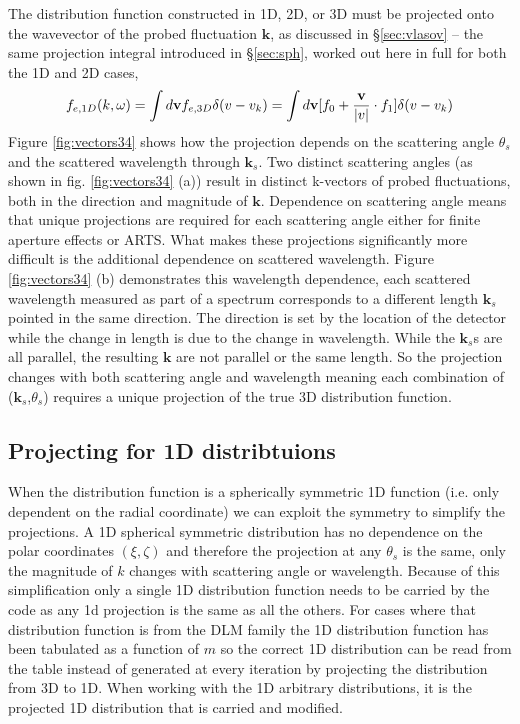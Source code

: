 \documentclass[11pt]{article}
\begin{document}
The distribution function constructed in 1D, 2D, or 3D must be projected onto the wavevector of the probed fluctuation $\textbf{k}$, as discussed in \S \ref{sec:vlasov} -- the same projection integral introduced in \S\ref{sec:sph}, worked out here in full for both the 1D and 2D cases,
\begin{equation}\label{fekw}
    f_{e,1D}(k,\omega)=\int d\textbf{v} f_{e,3D} \delta(v-v_k) \\
    = \int d\textbf{v} [f_0 +\frac{\textbf{v}}{|v|}\cdot f_{1}] \delta(v-v_k)
\end{equation}
Figure \ref{fig:vectors34} shows how the projection depends on the scattering angle $\theta_s$ and the scattered wavelength through $\textbf{k}_s$. Two distinct scattering angles (as shown in fig. \ref{fig:vectors34} (a)) result in distinct k-vectors of probed fluctuations, both in the direction and magnitude of $\textbf{k}$. Dependence on scattering angle means that unique projections are required for each scattering angle either for finite aperture effects or ARTS. What makes these projections significantly more difficult is the additional dependence on scattered wavelength. Figure \ref{fig:vectors34} (b) demonstrates this wavelength dependence, each scattered wavelength measured as part of a spectrum corresponds to a different length $\textbf{k}_s$ pointed in the same direction. The direction is set by the location of the detector while the change in length is due to the change in wavelength. While the $\textbf{k}_s$s are all parallel, the resulting $\textbf{k}$ are not parallel or the same length. So the projection changes with both scattering angle and wavelength meaning each combination of ($\textbf{k}_s$,$\theta_s$) requires a unique projection of the true 3D distribution function. 


\subsection{Projecting for 1D distribtuions}

When the distribution function is a spherically symmetric 1D function (i.e. only dependent on the radial coordinate) we can exploit the symmetry to simplify the projections. A 1D spherical symmetric distribution has no dependence on the polar coordinates $(\xi,\zeta)$ and therefore the projection at any $\theta_s$ is the same, only the magnitude of $k$ changes with scattering angle or wavelength. Because of this simplification only a single 1D distribution function needs to be carried by the code as any 1d projection is the same as all the others. For cases where that distribution function is from the DLM family the 1D distribution function has been tabulated as a function of $m$ so the correct 1D distribution can be read from the table instead of generated at every iteration by projecting the distribution from 3D to 1D. When working with the 1D arbitrary distributions, it is the projected 1D distribution that is carried and modified.
\end{document}
